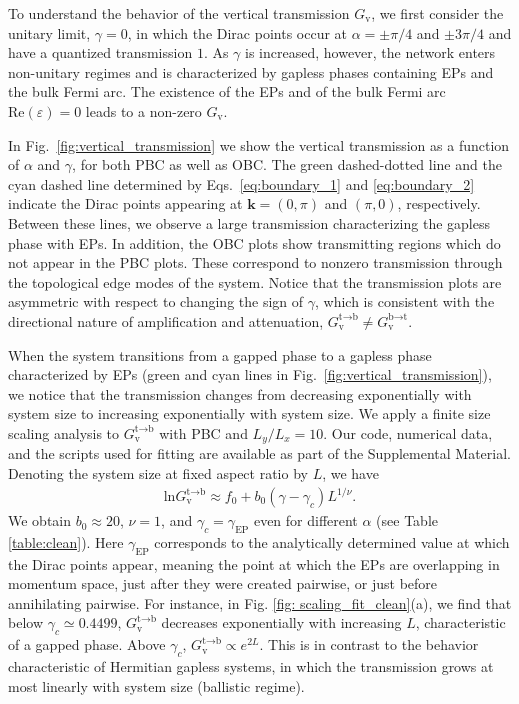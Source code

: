 \documentclass[aps,pra,reprint,superscriptaddress,showkeys,amsmath,amssymb,longbibliography]{revtex4-1}
\begin{document}
To understand the behavior of the vertical transmission $G_{\text{v}}$, we first consider the unitary limit, $\gamma=0$, in which the Dirac points occur at $\alpha=\pm\pi/4$ and $\pm3\pi/4$ and have a quantized transmission $1$. 
As $\gamma$ is increased, however, the network enters non-unitary regimes and is characterized by gapless phases containing EPs  and the bulk Fermi arc. 
The existence of the EPs and of the bulk Fermi arc $\text{Re}(\varepsilon)=0$ leads to a non-zero $G_\text{v}$. 

In Fig.~\ref{fig:vertical_transmission} we show the vertical transmission as a function of $\alpha$ and $\gamma$, for both PBC as well as OBC.
The green dashed-dotted line and the cyan dashed line determined by Eqs.~\eqref{eq:boundary_1} and \eqref{eq:boundary_2} indicate the Dirac points appearing at $\textbf{k} = (0,\pi)$ and $(\pi, 0)$, respectively.
Between these lines, we observe a large transmission characterizing the gapless phase with EPs. 
In addition, the OBC plots show transmitting regions which do not appear in the PBC plots.
These correspond to nonzero transmission through the topological edge modes of the system.
Notice that the transmission plots are asymmetric with respect to changing the sign of $\gamma$, which is consistent with the directional nature of amplification and attenuation, $G_{\text{v}}^{\text{t}\rightarrow\text{b}}\neq G_{\text{v}}^{\text{b}\rightarrow\text{t}}$.

When the system transitions from a gapped phase to a gapless phase characterized by EPs (green and cyan lines in Fig.~\ref{fig:vertical_transmission}), we notice that the transmission changes from decreasing exponentially with system size to increasing exponentially with system size.
We apply a finite size scaling analysis to $G_{\text{v}}^{\text{t}\rightarrow\text{b}}$ with PBC and $L_y/L_x=10$. 
Our code, numerical data, and the scripts used for fitting are available as part of the Supplemental Material.
Denoting the system size at fixed aspect ratio by $L$, we have
\begin{eqnarray}\label{eq:clean_fit}
\text{ln}G_{\text{v}}^{\text{t}\rightarrow\text{b}}\approx f_0+b_0(\gamma-\gamma_c)L^{1/\nu}.
\end{eqnarray}
We obtain $b_0\approx20$, $\nu=1$, and $\gamma_c=\gamma_{\text{EP}}$ even for different $\alpha$ (see Table \ref{table:clean}). 
Here $\gamma_{\text{EP}}$ corresponds to the analytically determined value at which the Dirac points appear, meaning the point at which the EPs are overlapping in momentum space, just after they were created pairwise, or just before annihilating pairwise.
For instance, in Fig. \ref{fig: scaling_fit_clean}(a), we find that below $\gamma_c\simeq 0.4499$, $G_{\text{v}}^{\text{t}\rightarrow\text{b}}$ decreases exponentially with increasing $L$, characteristic of a gapped phase.
Above $\gamma_c$, $G_{\text{v}}^{\text{t}\rightarrow\text{b}}\propto e^{2L}$.
This is in contrast to the behavior characteristic of Hermitian gapless systems, in which the transmission grows at most linearly with system size (ballistic regime).
\end{document}
